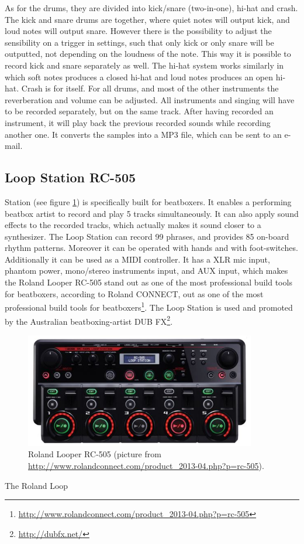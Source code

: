 As for the drums, they are divided into kick/snare (two-in-one), hi-hat and crash. The kick and snare drums are together, where quiet notes will output kick, and loud notes will output snare. However there is the possibility to adjust the sensibility on a trigger in settings, such that only kick or only snare will be outputted, not depending on the loudness of the note. This way it is possible to record kick and snare separately as well. The hi-hat system works similarly in which soft notes produces a closed hi-hat and loud notes produces an open hi-hat. Crash is for itself. For all drums, and most of the other instruments the reverberation and volume can be adjusted. 
All instruments and singing will have to be recorded separately, but on the same track. After having recorded an instrument, it will play back the previous recorded sounds while recording another one. It converts the samples into a MP3 file, which can be sent to an e-mail. 

\subsection{ Loop Station RC-505 }
\label{loopstation}
 Station (see figure \ref{Looper}) is specifically built for beatboxers. It enables a performing beatbox artist to record and play 5 tracks simultaneously. It can also apply sound effects to the recorded tracks, which actually makes it sound closer to a synthesizer. The Loop Station can record 99 phrases, and provides 85 on-board rhythm patterns. Moreover it can be operated with hands and with foot-switches. Additionally it can be used as a MIDI controller. It has a XLR mic input, phantom power, mono/stereo instruments input, and AUX input, which makes the Roland Looper RC-505 stand out as one of the most professional build tools for beatboxers, according to Roland CONNECT, out as one of the most professional build tools for beatboxers\footnote{\url{http://www.rolandconnect.com/product_2013-04.php?p=rc-505}}.
The Loop Station is used and promoted by the Australian beatboxing-artist DUB FX\footnote{\url{http://dubfx.net/}}.

\begin{figure}[h]
	\begin{center}
		\includegraphics[height=5cm]{fig/Roland-RC-505.JPG}
		\caption{Roland Looper RC-505 (picture from {\url{http://www.rolandconnect.com/product_2013-04.php?p=rc-505})}.}
		\label{Looper}
	\end{center}
\end{figure}
The Roland Loop
